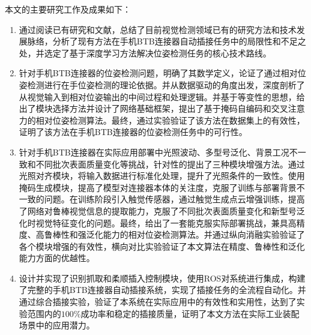 \documentclass{Diploma}
\begin{document}
本文的主要研究工作及成果如下：
\begin{enumerate}
  \item 通过阅读已有研究和文献，总结了目前视觉检测领域已有的研究方法和技术发展脉络，分析了现有方法在手机BTB连接器自动插接任务中的局限性和不足之处，并选定了基于深度学习方法解决位姿检测任务的核心技术路线。
  \item 针对手机BTB连接器的位姿检测问题，明确了其数学定义，论证了通过相对位姿检测进行在手位姿检测的理论依据。并从数据驱动的角度出发，深度剖析了从视觉输入到相对位姿输出的中间过程和处理逻辑。并基于等变性的思想，给出了模块选择方法并设计了网络基础框架，提出了基于掩码自编码和交叉注意力的相对位姿检测算法。最终，通过实验验证了该方法在数据集上的有效性，证明了该方法在手机BTB连接器的位姿检测任务中的可行性。
  \item 针对手机BTB连接器在实际应用部署中光照波动、多型号泛化、背景工况不一致和不同批次表面质量变化等挑战，针对性的提出了三种模块增强方法。通过光照对齐模块，将输入数据进行标准化处理，提升了光照条件的一致性。使用掩码生成模块，提高了模型对连接器本体的关注度，克服了训练与部署背景不一致的问题。在训练阶段引入触觉传感器，通过触觉生成点云增强训练，提高了网络对鲁棒视觉信息的提取能力，克服了不同批次表面质量变化和新型号泛化时视觉特征变化的问题。最终，给出了一套能克服实际部署挑战，兼具高精度、高鲁棒性和强泛化能力的相对位姿检测算法。并通过纵向消融实验验证了各个模块增强的有效性，横向对比实验验证了本文算法在精度、鲁棒性和泛化能力方面的优越性。
  \item 设计并实现了识别抓取和柔顺插入控制模块，使用ROS对系统进行集成，构建了完整的手机BTB连接器自动插接系统，实现了插接任务的全流程自动化。并通过综合插接实验，验证了本系统在实际应用中的有效性和实用性，达到了实验范围内的$100\%$成功率和稳定的插接质量，证明了本文方法在实际工业装配场景中的应用潜力。
\end{enumerate}
\end{document}
